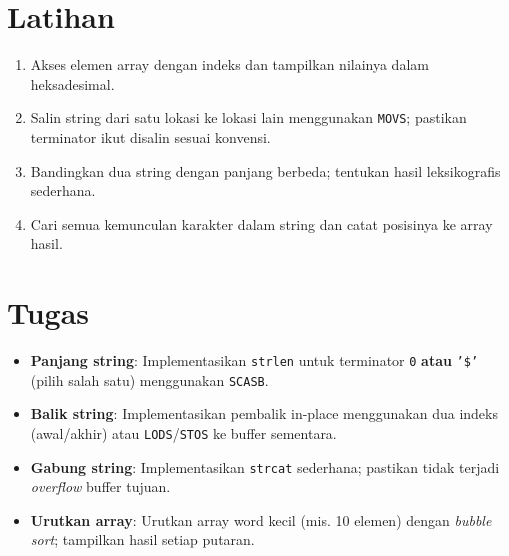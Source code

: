 \documentclass[../main.tex]{subfiles}
\begin{document}
\section{Latihan}
\begin{enumerate}
  \item Akses elemen array dengan indeks dan tampilkan nilainya dalam heksadesimal.
  \item Salin string dari satu lokasi ke lokasi lain menggunakan \texttt{MOVS}; pastikan terminator ikut disalin sesuai konvensi.
  \item Bandingkan dua string dengan panjang berbeda; tentukan hasil leksikografis sederhana.
  \item Cari semua kemunculan karakter dalam string dan catat posisinya ke array hasil.
\end{enumerate}

\section{Tugas}
\begin{itemize}
  \item \textbf{Panjang string}: Implementasikan \texttt{strlen} untuk terminator \texttt{0} \textbf{atau} \texttt{'{\$}'} (pilih salah satu) menggunakan \texttt{SCASB}.
  \item \textbf{Balik string}: Implementasikan pembalik in-place menggunakan dua indeks (awal/akhir) atau \texttt{LODS}/\texttt{STOS} ke buffer sementara.
  \item \textbf{Gabung string}: Implementasikan \texttt{strcat} sederhana; pastikan tidak terjadi \textit{overflow} buffer tujuan.
  \item \textbf{Urutkan array}: Urutkan array word kecil (mis. 10 elemen) dengan \textit{bubble sort}; tampilkan hasil setiap putaran.
\end{itemize}
\end{document}
